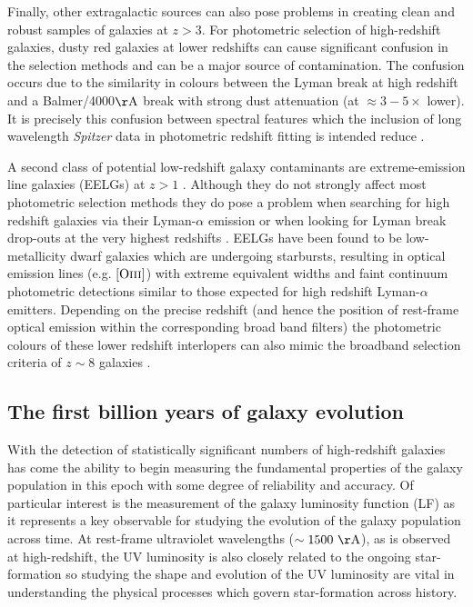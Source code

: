 Finally, other extragalactic sources can also pose problems in creating clean and robust samples of galaxies at $z>3$. For photometric selection of high-redshift galaxies, dusty red galaxies at lower redshifts can cause significant confusion in the selection methods and can be a major source of contamination. The confusion occurs due to the similarity in colours between the Lyman break at high redshift and a Balmer/4000$\rm{\AA}$ break with strong dust attenuation (at $\approx 3 - 5\times$ lower). It is precisely this confusion between spectral features which the inclusion of long wavelength \emph{Spitzer} data in photometric redshift fitting is intended reduce \citep{2011MNRAS.418.2074M}.

A second class of potential low-redshift galaxy contaminants are extreme-emission line galaxies (EELGs) at $z > 1$ \citep{vanderWel:2011ch,Atek:2011ka}. Although they do not strongly affect most photometric selection methods they do pose a problem when searching for high redshift galaxies via their Lyman-$\alpha$ emission or when looking for Lyman break drop-outs at the very highest redshifts \citep{Brammer:2013dg}. EELGs have been found to be low-metallicity dwarf galaxies which are undergoing starbursts, resulting in optical emission lines (e.g. $\left [\rm{O}\textsc{iii} \right]$) with extreme equivalent widths and faint continuum photometric detections similar to those expected for high redshift Lyman-$\alpha$ emitters. Depending on the precise redshift (and hence the position of rest-frame optical emission within the corresponding broad band filters) the photometric colours of these lower redshift interlopers can also mimic the broadband selection criteria of $z\sim8$ galaxies \citep{Atek:2011ka}.

\subsection{The first billion years of galaxy evolution}\label{sec:intro-earlygal}

With the detection of statistically significant numbers of high-redshift galaxies has come the ability to begin measuring the fundamental properties of the galaxy population in this epoch with some degree of reliability and accuracy. Of particular interest is the measurement of the galaxy luminosity function (LF) as it represents a key observable for studying the evolution of the galaxy population across time. At rest-frame ultraviolet wavelengths ($\sim1500~\rm{\AA}$), as is observed at high-redshift, the UV luminosity is also closely related to the ongoing star-formation so studying the shape and evolution of the UV luminosity are vital in understanding the physical processes which govern star-formation across history.

